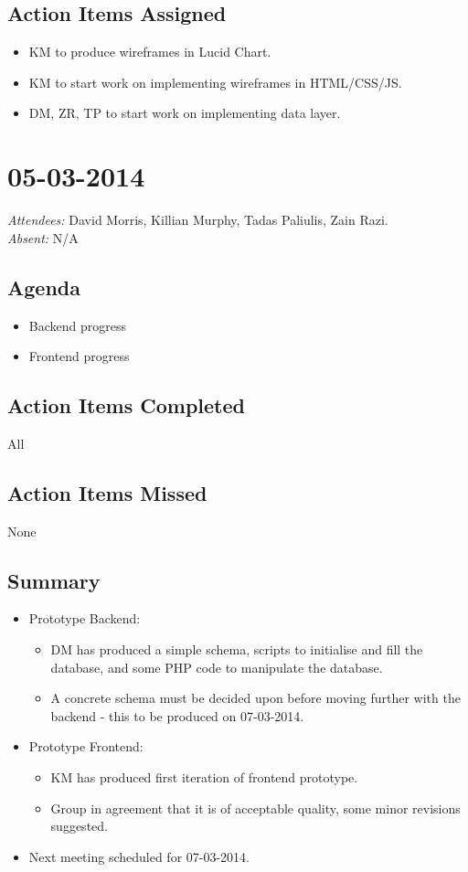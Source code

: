 \documentclass{article}
\begin{document}
\subsection*{Action Items Assigned}
\begin{itemize}
\item KM to produce wireframes in Lucid Chart.
\item KM to start work on implementing wireframes in HTML/CSS/JS.
\item DM, ZR, TP to start work on implementing data layer.
\end{itemize}



\clearpage

\section*{05-03-2014}
\vspace{0.5cm}
\emph{Attendees: }David Morris, Killian Murphy, Tadas Paliulis, Zain Razi.
\\
\emph{Absent: }N/A

\subsection*{Agenda}
\begin{itemize}
\item Backend progress
\item Frontend progress
\end{itemize}
\subsection*{Action Items Completed}
All

\subsection*{Action Items Missed}
None

\subsection*{Summary}
\begin{itemize}
\item Prototype Backend:
  \begin{itemize}
  \item DM has produced a simple schema, scripts to initialise and fill the database, and some PHP code to manipulate the database.
  \item A concrete schema must be decided upon before moving further with the backend - this to be produced on 07-03-2014.
  \end{itemize}
\item Prototype Frontend:
  \begin{itemize}
  \item KM has produced first iteration of frontend prototype.
  \item Group in agreement that it is of acceptable quality, some minor revisions suggested.
  \end{itemize}
\item Next meeting scheduled for 07-03-2014.
\end{itemize}
\end{document}
